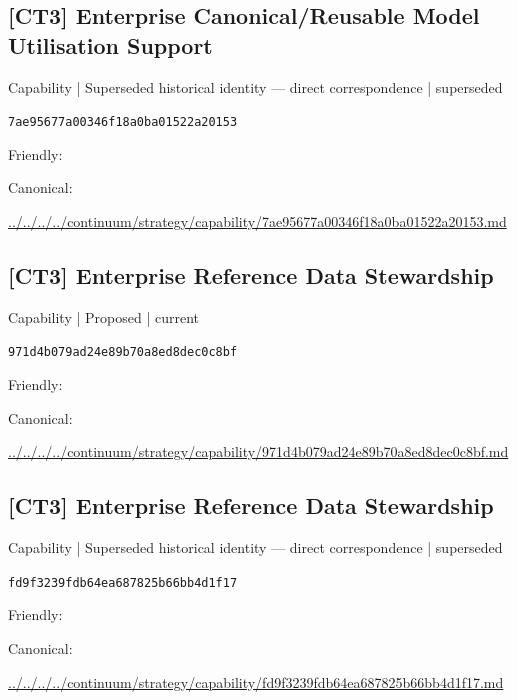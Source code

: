 \documentclass[10pt,a4paper]{article}
\begin{document}
\subsection*{[CT3] Enterprise Canonical/Reusable Model Utilisation Support}
{\small Capability | Superseded historical identity — direct correspondence | superseded}\par
\texttt{7ae95677a00346f18a0ba01522a20153}\par
Friendly: \par
Canonical: \par
{\footnotesize\url{../../../../continuum/strategy/capability/7ae95677a00346f18a0ba01522a20153.md}}\par
\subsection*{[CT3] Enterprise Reference Data Stewardship}
{\small Capability | Proposed | current}\par
\texttt{971d4b079ad24e89b70a8ed8dec0c8bf}\par
Friendly: \par
Canonical: \par
{\footnotesize\url{../../../../continuum/strategy/capability/971d4b079ad24e89b70a8ed8dec0c8bf.md}}\par
\subsection*{[CT3] Enterprise Reference Data Stewardship}
{\small Capability | Superseded historical identity — direct correspondence | superseded}\par
\texttt{fd9f3239fdb64ea687825b66bb4d1f17}\par
Friendly: \par
Canonical: \par
{\footnotesize\url{../../../../continuum/strategy/capability/fd9f3239fdb64ea687825b66bb4d1f17.md}}\par
\end{document}
